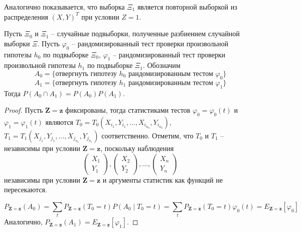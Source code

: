Аналогично показывается, что выборка $\Xi_1$ является повторной выборкой из распределения $(X,Y)^T$ при условии $Z=1$.

\begin{theorem}\label{main_theorem}
    Пусть $\Xi_0$ и $\Xi_1$ -- случайные подвыборки, полученные разбиением случайной выборки $\Xi$.
    Пусть $\varphi_0$ -- рандомизированный тест проверки произвольной гипотезы $h_0$ по подвыборке $\Xi_0$,
    $\varphi_1$ -- рандомизированный тест проверки произвольной гипотезы $h_1$ по подвыборке $\Xi_1$. Обозначим
    $$A_0 = \{\text{отвергнуть гипотезу $h_0$ рандомизированным тестом $\varphi_0$}\}$$ 
    $$A_1 = \{\text{отвергнуть гипотезу $h_1$ рандомизированным тестом $\varphi_1$}\}$$
    Тогда $P(A_0 \cap A_1)= P(A_0) P(A_1)$.
\end{theorem}
\begin{proof}
    Пусть $\mathbf{Z}=\mathbf{z}$ фиксированы, тогда
    статистиками тестов $\varphi_0=\varphi_0(t)$ и 
    $\varphi_1=\varphi_1(t)$ являются $T_0=T_0(X_{i_1},Y_{i_1},\ldots,X_{i_{n_0}},Y_{i_{n_0}})$,
    $T_1=T_1(X_{j_1},Y_{j_1},\ldots,X_{j_{n_1}},Y_{j_{n_1}})$ соответственно.
    Отметим, что $T_0$ и $T_1$ -- независимы при условии $\mathbf{Z}=\mathbf{z}$, поскольку
    наблюдения
    $$
    \begin{pmatrix}
        X_1 \\
        Y_1
    \end{pmatrix},
    \begin{pmatrix}
        X_2 \\
        Y_2
    \end{pmatrix}, \ldots,
    \begin{pmatrix}
        X_n \\
        Y_n
    \end{pmatrix}
    $$
    независимы при условии $\mathbf{Z}=\mathbf{z}$
    и аргументы статистик как функций не пересекаются.
    
    $$
    P_{\mathbf{Z=z}}(A_0)=
    \sum_{t}P_{\mathbf{Z=z}}(T_0=t)P(A_0 \mid T_0=t) 
    =\sum_{t}P_{\mathbf{Z=z}}(T_0=t)\varphi_0(t)=E_{\mathbf{Z=z}}[\varphi_0]
    $$
    Аналогично, $P_{\mathbf{Z=z}}(A_1)=E_{\mathbf{Z=z}}[\varphi_1]$.


\end{proof}
